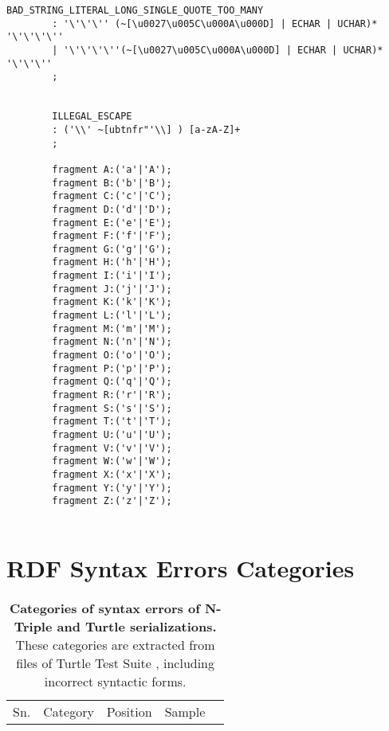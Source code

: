 \begin{appendices}
\begin{lstlisting}[breaklines,basicstyle=\ttfamily]
		BAD_STRING_LITERAL_LONG_SINGLE_QUOTE_TOO_MANY
		: '\'\'\'' (~[\u0027\u005C\u000A\u000D] | ECHAR | UCHAR)*  '\'\'\'\''
		| '\'\'\'\''(~[\u0027\u005C\u000A\u000D] | ECHAR | UCHAR)*  '\'\'\''
		;
		
		
		ILLEGAL_ESCAPE
		: ('\\' ~[ubtnfr"'\\] ) [a-zA-Z]+ 
		;
		
		fragment A:('a'|'A');
		fragment B:('b'|'B');
		fragment C:('c'|'C');
		fragment D:('d'|'D');
		fragment E:('e'|'E');
		fragment F:('f'|'F');
		fragment G:('g'|'G');
		fragment H:('h'|'H');
		fragment I:('i'|'I');
		fragment J:('j'|'J');
		fragment K:('k'|'K');
		fragment L:('l'|'L');
		fragment M:('m'|'M');
		fragment N:('n'|'N');
		fragment O:('o'|'O');
		fragment P:('p'|'P');
		fragment Q:('q'|'Q');
		fragment R:('r'|'R');
		fragment S:('s'|'S');
		fragment T:('t'|'T');
		fragment U:('u'|'U');
		fragment V:('v'|'V');
		fragment W:('w'|'W');
		fragment X:('x'|'X');
		fragment Y:('y'|'Y');
		fragment Z:('z'|'Z');	


\end{lstlisting}

\chapter{RDF Syntax Errors Categories }
\label{ch:synErrCategories}


\setcounter{cA}{1}
\begin{longtable}{|c|p{3cm}|p{3cm}|l|l}
\caption{\textbf{Categories of syntax errors of N-Triple and Turtle serializations.} These categories are extracted from files of Turtle Test Suite \cite{TurtleTests:Online}, including   incorrect syntactic forms.}
\label{tab:syntaxErrorCate}
\centering
\cline{2-5}
Sn. & Category & Position & Sample &  \\  
\cline{1-4}


\end{longtable}
\end{appendices}
